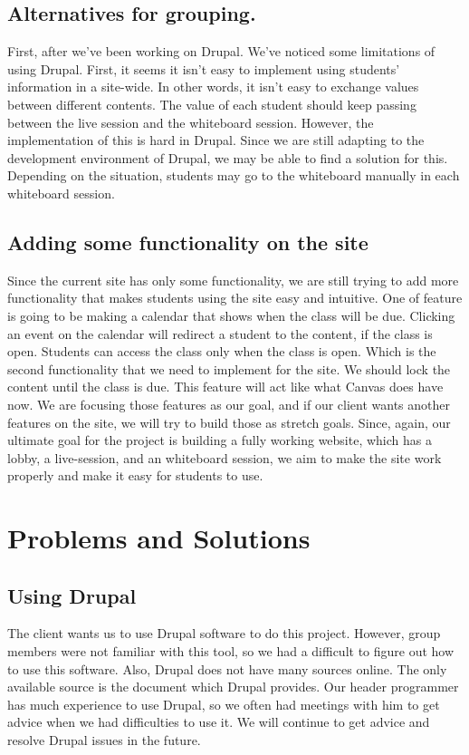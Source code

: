 \documentclass[10pt, letterpaper]{article}
\begin{document}
    \subsection{Alternatives for grouping.}
    
    First, after we’ve been working on Drupal. We’ve noticed some limitations of using Drupal. First, it seems it isn’t easy to implement using students’ information in a site-wide. In other words, it isn’t easy to exchange values between different contents. The value of each student should keep passing between the live session and the whiteboard session. However, the implementation of this is hard in Drupal. Since we are still adapting to the development environment of Drupal, we may be able to find a solution for this. Depending on the situation, students may go to the whiteboard manually in each whiteboard session.
    
    \subsection{Adding some functionality on the site}
    Since the current site has only some functionality, we are still trying to add more functionality that makes students using the site easy and intuitive. One of feature is going to be making a calendar that shows when the class will be due. Clicking an event on the calendar will redirect a student to the content, if the class is open. Students can access the class only when the class is open. Which is the second functionality that we need to implement for the site. We should lock the content until the class is due. This feature will act like what Canvas does have now. We are focusing those features as our goal, and if our client wants another features on the site, we will try to build those as stretch goals. Since, again, our ultimate goal for the project is building a fully working website, which has a lobby, a live-session, and an whiteboard session, we aim to make the site work properly and make it easy for students to use.

        

\section{Problems and Solutions}
    \subsection{Using Drupal}
        The client wants us to use Drupal software to do this project. However, group members were not familiar with this tool, so we had a difficult to figure out how to use this software. Also, Drupal does not have many sources online. The only available source is the document which Drupal provides. Our header programmer has much experience to use Drupal, so we often had meetings with him to get advice when we had difficulties to use it. We will continue to get advice and resolve Drupal issues in the future.
\end{document}
